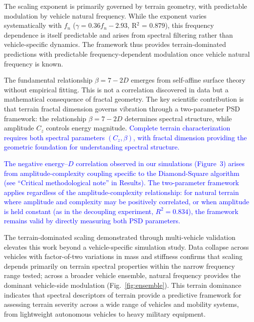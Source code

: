 \documentclass[11pt]{article}
\begin{document}
The scaling exponent is primarily governed by terrain geometry, with predictable modulation by vehicle natural frequency. While the exponent varies systematically with $f_n$ ($\gamma = 0.36 f_n - 2.93$, R$^2$ = 0.879), this frequency dependence is itself predictable and arises from spectral filtering rather than vehicle-specific dynamics. The framework thus provides terrain-dominated predictions with predictable frequency-dependent modulation once vehicle natural frequency is known.

The fundamental relationship $\beta = 7-2D$ emerges from self-affine surface theory without empirical fitting\cite{Mandelbrot1982,Turcotte1997}. This is not a correlation discovered in data but a mathematical consequence of fractal geometry. The key scientific contribution is that terrain fractal dimension governs vibration through a two-parameter PSD framework: the relationship $\beta = 7-2D$ determines spectral structure, while amplitude $C_z$ controls energy magnitude. \textcolor{blue}{Complete terrain characterization requires both spectral parameters $(C_z, \beta)$, with fractal dimension providing the geometric foundation for understanding spectral structure.}

\textcolor{blue}{The negative energy--$D$ correlation observed in our simulations (Figure~3) arises from amplitude-complexity coupling specific to the Diamond-Square algorithm (see ``Critical methodological note'' in Results). The two-parameter framework applies regardless of the amplitude-complexity relationship: for natural terrain where amplitude and complexity may be positively correlated, or when amplitude is held constant (as in the decoupling experiment, $R^2 = 0.834$), the framework remains valid by directly measuring both PSD parameters.}

The terrain-dominated scaling demonstrated through multi-vehicle validation elevates this work beyond a vehicle-specific simulation study. Data collapse across vehicles with factor-of-two variations in mass and stiffness confirms that scaling depends primarily on terrain spectral properties within the narrow frequency range tested; across a broader vehicle ensemble, natural frequency provides the dominant vehicle-side modulation (Fig.~\ref{fig:ensemble}). This terrain dominance indicates that spectral descriptors of terrain provide a predictive framework for assessing terrain severity across a wide range of vehicles and mobility systems, from lightweight autonomous vehicles to heavy military equipment.
\end{document}
